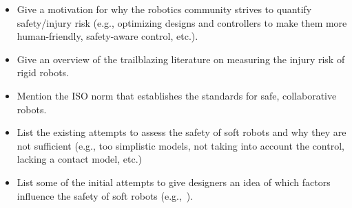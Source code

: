 \begin{itemize}
    \item Give a motivation for why the robotics community strives to quantify safety/injury risk (e.g., optimizing designs and controllers to make them more human-friendly, safety-aware control, etc.).
    \item Give an overview of the trailblazing literature on measuring the injury risk of rigid robots.
    \item Mention the ISO norm that establishes the standards for safe, collaborative robots.
    \item List the existing attempts to assess the safety of soft robots and why they are not sufficient (e.g., too simplistic models, not taking into account the control, lacking a contact model, etc.)
    \item List some of the initial attempts to give designers an idea of which factors influence the safety of soft robots (e.g.,~\citep{abidi2017intrinsic}).
\end{itemize}

